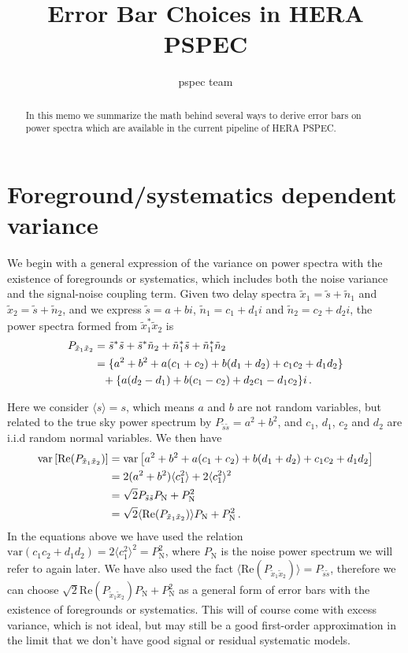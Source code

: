 \documentclass[12pt,a4paper]{article}
\title{Error Bar Choices in HERA PSPEC}
\author{pspec team}
\begin{document}
\maketitle{}
\begin{abstract}
    In this memo we summarize the math behind several ways to derive error bars on power spectra which are available in the current pipeline of HERA PSPEC.  
\end{abstract}

\section{Foreground/systematics dependent variance}
\label{ap:fg_dependent_var}

We begin with a general expression of the variance on power spectra with the existence of foregrounds or systematics, which includes both the noise variance and the signal-noise coupling term. Given two delay spectra $\tilde{x}_1 = \tilde{s} + \tilde{n}_1$ and $\tilde{x}_2 = \tilde{s} + \tilde{n}_2$, and we express $\tilde{s} = a + b i$, $\tilde{n}_1 = c_1 + d_1 i$ and $\tilde{n}_2 = c_2 + d_2 i$, the power spectra formed from $\tilde{x}_1^* \tilde{x}_2$ is 
\begin{align*}
P_{\tilde{x}_1\tilde{x}_2} & = \tilde{s}^*\tilde{s} + \tilde{s}^*\tilde{n}_2 + \tilde{n}_1^*\tilde{s} + 
\tilde{n}_1^*\tilde{n}_2 \notag \\
& = \{a^2+b^2 + a(c_1+c_2) + b(d_1+d_2) + c_1c_2 + d_1d_2\} \notag \\
& \phantom{=} + \{a(d_2-d_1)+b(c_1-c_2)+d_2 c_1-d_1 c_2\}i \,.
\end{align*}

Here we consider $\langle s \rangle = s$, which means $a$ and $b$ are not random variables, but related to the true sky power spectrum by $P_{\tilde{s}\tilde{s}} = a^2 +b^2$, and $c_1$, $d_1$, $c_2$ and $d_2$ are i.i.d random normal variables. We then have 
\begin{align}
\label{eq:var_real_ps}
\text{var} \left[\text{Re} (P_{\tilde{x}_1\tilde{x}_2}) \right] &= \text{var} \left[a^2+b^2 + a(c_1+c_2) + b(d_1+d_2) + c_1c_2 + d_1d_2 \right] \notag \\
& = 2(a^2+b^2)\langle c_1^2\rangle + 2\langle c_1^2\rangle^2 \notag \\
& = \sqrt{2}P_{\tilde{s}\tilde{s}}P_\text{N} + P_\text{N}^2 \notag \\
& = \sqrt{2}\langle \text{Re} (P_{\tilde{x}_1\tilde{x}_2})\rangle P_\text{N} + P_\text{N}^2 \,.
\end{align}
In the equations above we have used the relation $\text{var} ( c_1c_2 + d_1d_2) = 2\langle c_1^2\rangle^2 = P_\text{N}^2$, where $P_\text{N}$ is the noise power spectrum we will refer to again later. We have also used the fact $\langle \text{Re} (P_{\tilde{x}_1\tilde{x}_2})\rangle = P_{\tilde{s}\tilde{s}}$, therefore we can choose $\sqrt{2}\text{Re} (P_{\tilde{x}_1\tilde{x}_2}) P_\text{N} + P_\text{N}^2$ as a general form of error bars with the existence of foregrounds or systematics. This will of course come with excess variance, which is not ideal, but may still be a good first-order approximation in the limit that we don't have good signal or residual systematic models. 
\end{document}
